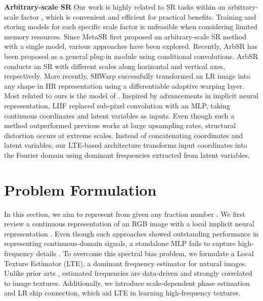 \documentclass[10pt,twocolumn,letterpaper]{article}
\begin{document}
{\bf Arbitrary-scale SR} Our work is highly related to SR tasks within an arbitrary-scale factor \cite{hu2019meta, SRWarp, Wang2020Learning, chen2021learning}, which is convenient and efficient for practical benefits. Training and storing models for each specific scale factor \cite{DBLP:journals/corr/ShiCHTABRW16, Lim_2017_CVPR_Workshops, zhang2018residual, zhang2018rcan, DBLP:conf/cvpr/Chen000DLMX0021, liang2021swinir} is unfeasible when considering limited memory resources. Since MetaSR \cite{hu2019meta} first proposed an arbitrary-scale SR method with a single model, various approaches have been explored. Recently, ArbSR \cite{Wang2020Learning} has been proposed as a general plug-in module using conditional convolutions. ArbSR conducts an SR with different scales along horizontal and vertical axes, respectively. More recently, SRWarp \cite{SRWarp} successfully transformed an LR image into any shape in HR representation using a differentiable adaptive warping layer. Most related to ours is the model of \cite{chen2021learning}. Inspired by advancements in implicit neural representation, LIIF replaced sub-pixel convolution with an MLP, taking continuous coordinates and latent variables as inputs. Even though such a method outperformed previous works at large upsampling rates, structural distortion occurs at extreme scales. Instead of concatenating coordinates and latent variables, our LTE-based architecture transforms input coordinates into the Fourier domain using dominant frequencies extracted from latent variables.

\section{Problem Formulation}

























In this section, we aim to represent  from  given any fraction number . We first review a continuous representation of an RGB image with a local implicit neural representation \cite{Local_Implicit_Grid_CVPR20, chen2021learning}. Even though such approaches showed outstanding performance in representing continuous-domain signals, a standalone MLP fails to capture high-frequency details \cite{DBLP:conf/icml/RahamanBADLHBC19}. To overcome this spectral bias problem, we formulate a Local Texture Estimator (LTE), a dominant frequency estimator for natural images. Unlike prior arts \cite{mildenhall2020nerf, tancik2020fourfeat}, estimated frequencies are data-driven and strongly correlated to image textures. Additionally, we introduce scale-dependent phase estimation and LR skip connection, which aid LTE in learning high-frequency textures.
\end{document}
